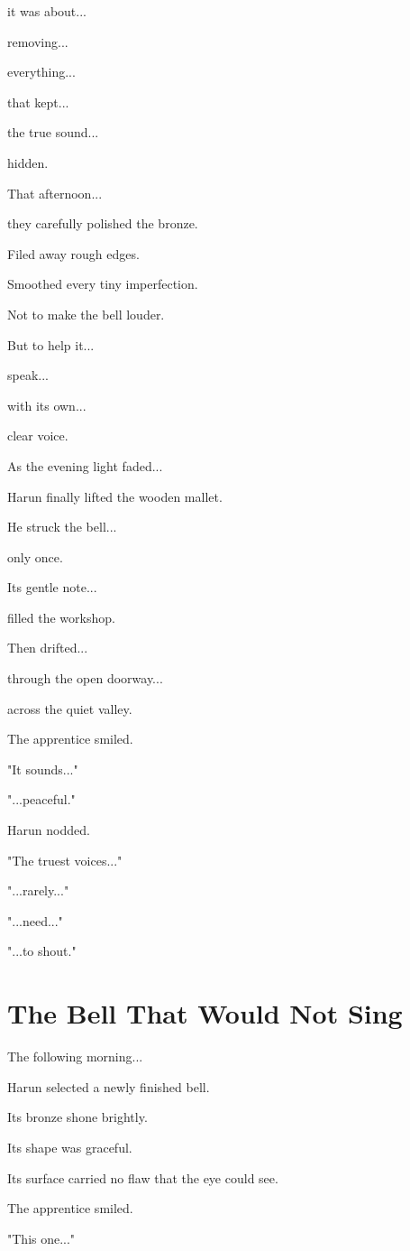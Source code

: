 \documentclass[12pt,openany]{book}
\begin{document}
it was about...

removing...

everything...

that kept...

the true sound...

hidden.

That afternoon...

they carefully polished the bronze.

Filed away rough edges.

Smoothed every tiny imperfection.

Not to make the bell louder.

But to help it...

speak...

with its own...

clear voice.

As the evening light faded...

Harun finally lifted the wooden mallet.

He struck the bell...

only once.

Its gentle note...

filled the workshop.

Then drifted...

through the open doorway...

across the quiet valley.

The apprentice smiled.

"It sounds..."

"...peaceful."

Harun nodded.

"The truest voices..."

"...rarely..."

"...need..."

"...to shout."
\section*{The Bell That Would Not Sing}

The following morning...

Harun selected a newly finished bell.

Its bronze shone brightly.

Its shape was graceful.

Its surface carried no flaw that the eye could see.

The apprentice smiled.

"This one..."
\end{document}
